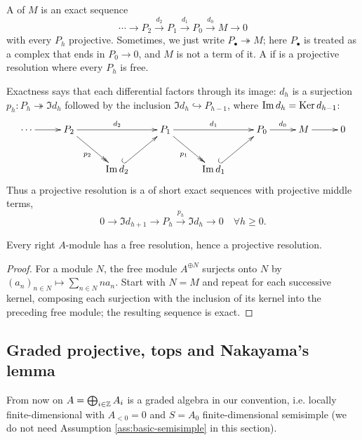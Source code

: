 \begin{definition}\label{def:projective-resolution}
A  of $M$ is an exact sequence
\begin{equation}\label{eq:projective-resolution}
\cdots\longrightarrow P_2\xrightarrow{d_2}P_1
\xrightarrow{d_1}P_0\xrightarrow{d_0}M\longrightarrow0
\end{equation}
with every $P_h$ projective.
Sometimes, we just write $P_\bullet\twoheadrightarrow M$; here  $P_\bullet$ is treated as a complex that ends in $P_0\to0$, and $M$ is not a term of it.
A  if is a projective resolution where every $P_h$ is free.
\end{definition}
Exactness says that each differential factors through its image: $d_h$ is a surjection $p_h:P_h\twoheadrightarrow\Im d_h$ followed by the inclusion $\Im d_h\hookrightarrow P_{h-1}$, where $\operatorname{Im}\nolimits d_h=\operatorname{Ker}\nolimits d_{h-1}$: \[
\xymatrix@C=26pt@R=26pt{
\cdots\ar[r] & P_2\ar[rr]^{d_2}\ar@{->>}[dr]_{p_2} & & P_1\ar[rr]^{d_1}\ar@{->>}[dr]_{p_1} & & P_0\ar[r]^{d_0} & M\ar[r] & 0\\
& & \Im d_2\ar@{^{(}->}[ur] & & \Im d_1\ar@{^{(}->}[ur] & &
}
\]
Thus a projective resolution is a  of short exact sequences with projective middle terms,
\[
0\to\Im d_{h+1}\to P_h\xrightarrow{\,p_h\,}\Im d_h\to0\quad \forall h\geq0.
\]

\begin{proposition}\label{prop:resolutions-exist}
Every right $A$-module has a free resolution, hence a projective resolution.
\end{proposition}

\begin{proof}
For a module $N$, the free module $A^{\oplus N}$ surjects onto $N$ by $(a_n)_{n\in N}\mapsto\sum_{n\in N}na_n$.
Start with $N=M$ and repeat for each successive kernel, composing each surjection with the inclusion of its kernel into the preceding free module; the resulting sequence is exact.
\end{proof}

\subsection{Graded projective, tops and Nakayama's lemma}\label{subsec:graded-resolutions}

From now on $A=\bigoplus_{i\in\mathbb{Z}}A_i$ is a graded algebra in our convention, i.e. locally finite-dimensional with $A_{<0}=0$ and $S=A_0$ finite-dimensional semisimple (we do not need Assumption \ref{ass:basic-semisimple} in this section).

